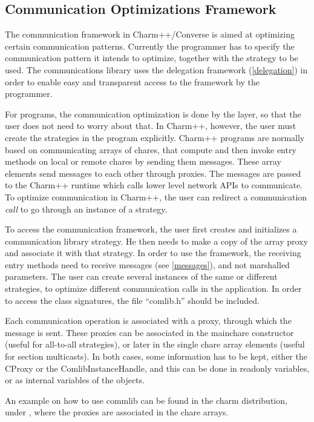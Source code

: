 \subsection{Communication Optimizations Framework}

The communication framework in Charm++/Converse is aimed at optimizing certain
communication patterns. Currently the programmer has to specify the
communication pattern it intends to optimize, together with the strategy to be
used. The communications library uses the delegation framework
(\ref{delegation}) in order to enable easy and transparent access to the
framework by the programmer.

For \ampi{} programs, the communication optimization is done by the \ampi{}
layer, so that the user does not need to worry about that. In Charm++, however,
the user must create the strategies in the program explicitly. Charm++ programs
are normally based on communicating arrays of chares, that compute and then
invoke entry methods on local or remote chares by sending them messages. These
array elements send messages to each other through proxies. The messages are
passed to the Charm++ runtime which calls lower level network APIs to
communicate. To optimize communication in Charm++, the user can redirect a
communication {\em call} to go through an instance of a strategy.

To access the communication framework, the user first creates and initializes a
communication library strategy. He then needs to make a copy of the array proxy
and associate it with that strategy. In order to use the framework, the
receiving entry methods need to receive messages (see \ref{messages}), and not
marshalled parameters. The user can create several instances of the same or
different strategies, to optimize different communication calls in the
application. In order to access the class signatures, the file ``comlib.h''
should be included.

Each communication operation is associated with a proxy, through which the
message is sent. These proxies can be associated in the mainchare constructor
(useful for all-to-all strategies), or later in the single chare
array elements (useful for section multicasts). In both cases, some
information has to be kept, either the CProxy or the ComlibInstanceHandle, and
this can be done in readonly variables, or as internal variables of the objects.

An example on how to use commlib can be found in the charm distribution, under
, where the proxies are associated in the
chare arrays.



